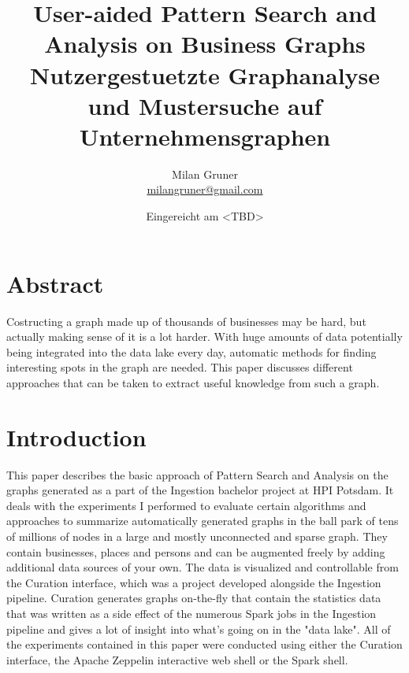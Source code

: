 \documentclass[
        a4paper,     %
        titlepage,   %
        twoside,     %
        parskip      %
        ]{scrartcl}  %
\title{
  User-aided Pattern Search and Analysis on Business Graphs
  \\ \bigskip
  \large{Nutzergestuetzte Graphanalyse und Mustersuche auf Unternehmensgraphen}
}
\author{Milan Gruner\\{\small{\url{milangruner@gmail.com}}}}
\date{Eingereicht am <TBD>}
\begin{document}
  \maketitle    %
  \clearpage %

  \section*{Abstract}
  { \huge
    Costructing a graph made up of thousands of businesses may be hard, but actually making sense of it is a lot harder.
    With huge amounts of data potentially being integrated into the data lake every day, automatic methods for finding interesting spots in the graph are needed.
    This paper discusses different approaches that can be taken to extract useful knowledge from such a graph.
  }

  \clearpage
  \tableofcontents


  \section{Introduction}
    This paper describes the basic approach of Pattern Search and Analysis
    on the graphs generated as a part of the Ingestion bachelor project at HPI Potsdam.
    It deals with the experiments I performed to evaluate certain algorithms and approaches to summarize
    automatically generated graphs in the ball park of tens of millions of nodes in
    a large and mostly unconnected and sparse graph.
    They contain businesses, places and persons and can be augmented freely by adding
    additional data sources of your own. The data is visualized and controllable from the
    Curation interface, which was a project developed alongside the Ingestion pipeline.
    Curation generates graphs on-the-fly that contain the statistics data that was written
    as a side effect of the numerous Spark jobs in the Ingestion pipeline and gives
    a lot of insight into what's going on in the "data lake".
    All of the experiments contained in this paper were conducted using either
    the Curation interface, the Apache Zeppelin interactive web shell or the Spark shell.
\end{document}
